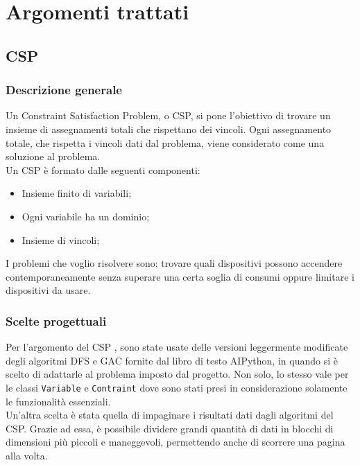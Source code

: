 \documentclass[12pt, letterpaper]{article}
\begin{document}
\section{Argomenti trattati}

\subsection{CSP}

\subsubsection{Descrizione generale}

Un Constraint Satisfaction Problem, o CSP, si pone l'obiettivo di trovare un insieme di assegnamenti totali che
rispettano dei vincoli. Ogni assegnamento totale, che rispetta i vincoli dati dal problema,  viene considerato come
una soluzione al problema. \\

\noindent Un CSP è formato dalle seguenti componenti:
\begin{itemize}
      \item Insieme finito di variabili;
      \item Ogni variabile ha un dominio;
      \item Insieme di vincoli;
\end{itemize}

\noindent I problemi che voglio risolvere sono: trovare quali dispositivi possono accendere
contemporaneamente senza superare una certa soglia di consumi oppure limitare i
dispositivi da usare.

\subsubsection{Scelte progettuali}

\noindent Per l'argomento del CSP \cite{ai-python-csp}, sono state usate delle versioni leggermente modificate degli
algoritmi DFS e GAC fornite dal libro di testo AIPython, in quando si è scelto di adattarle al problema
imposto dal progetto. Non solo, lo stesso vale per le classi \texttt{Variable} e \texttt{Contraint} dove sono
stati presi in considerazione solamente le funzionalità essenziali. \\

\noindent Un'altra scelta è stata quella di impaginare \cite{pagination} i risultati dati dagli algoritmi del CSP.
Grazie ad essa, è possibile  dividere grandi quantità di dati in blocchi di dimensioni più piccoli e maneggevoli,
permettendo anche di scorrere una pagina alla volta. \\
\end{document}

